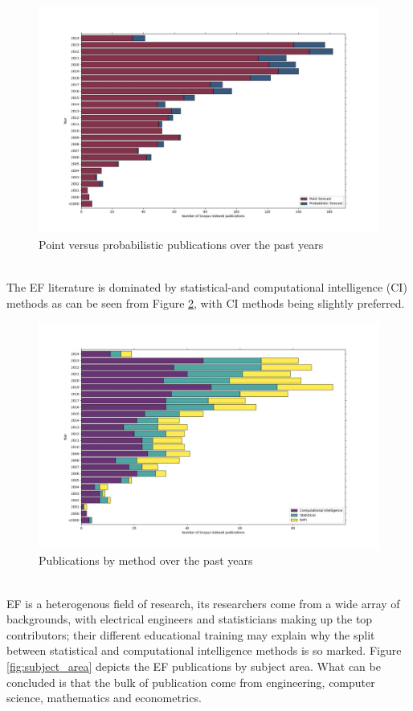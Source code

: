 \begin{figure}
  \includegraphics[width=\textwidth]{images/point_vs_prob.jpg}
  \caption{Point versus probabilistic publications over the past years}
  \label{fig:point_vs_prob}
\end{figure}
\\
The EF literature is dominated by statistical-and computational intelligence (CI) methods as can be seen from Figure \ref{fig:cs_stat_both}, with CI methods being slightly preferred. 
\begin{figure}
  \includegraphics[width=\textwidth]{images/cs_stat_both.jpg}
  \caption{Publications by method over the past years}
  \label{fig:cs_stat_both}
\end{figure}
\\
EF is a heterogenous field of research, its researchers come from a wide array of backgrounds, with electrical engineers and statisticians making up the top contributors; their different educational training may explain why the split between statistical and computational intelligence methods is so marked. Figure \ref{fig:subject_area} depicts the EF publications by subject area. What can be concluded is that the bulk of publication come from engineering, computer science, mathematics and econometrics.
